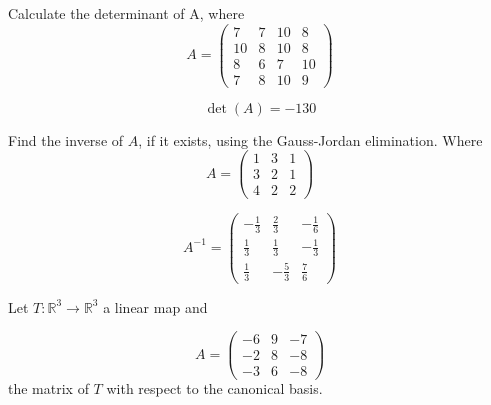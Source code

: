 \begin{questions}

\question Calculate the determinant of A, where
$$
A=\left(\begin{array}{rrrr}
7 & 7 & 10 & 8 \\
10 & 8 & 10 & 8 \\
8 & 6 & 7 & 10 \\
7 & 8 & 10 & 9
\end{array}\right)
$$

\begin{solution}
$$\det(A)=-130$$
\end{solution}

\question Find the inverse of $A$, if it exists, using the Gauss-Jordan elimination. Where
$$
A=\left(\begin{array}{rrr}
1 & 3 & 1 \\
3 & 2 & 1 \\
4 & 2 & 2
\end{array}\right)
$$

\begin{solution}
$$A^{-1}=\left(\begin{array}{rrr}
-\frac{1}{3} & \frac{2}{3} & -\frac{1}{6} \\
\frac{1}{3} & \frac{1}{3} & -\frac{1}{3} \\
\frac{1}{3} & -\frac{5}{3} & \frac{7}{6}
\end{array}\right)$$
\end{solution}

\question Let $T:\mathbb{R}^3\rightarrow\mathbb{R}^3$  a linear map and
 
$$
A=\left(\begin{array}{rrr}
-6 & 9 & -7 \\
-2 & 8 & -8 \\
-3 & 6 & -8
\end{array}\right)
$$
the matrix of $T$ with respect to the canonical basis.
\end{questions}
